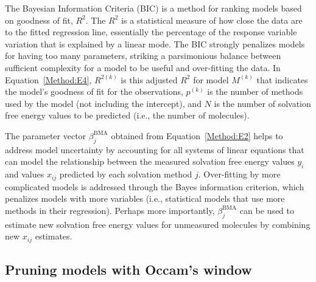 \documentclass[journal=jpcbfk, manuscript=article]{achemso}
\newcommand{\+}[1]{\ensuremath{\mathbf{#1}}}
\newcommand{\rev}[1]{#1}
\begin{document}
\rev{The Bayesian Information Criteria (BIC) is a method for ranking models based on goodness of fit, $R^2$.
The $R^2$ is a statistical measure of how close the data are to the fitted regression line, essentially the percentage of the response variable variation that is explained by a linear mode.
The BIC strongly penalizes models for having too many parameters, striking a parsimonious balance between sufficient complexity for a model to be useful and over-fitting the data. 
In Equation~\ref{Method:E4},  $R^{2(k)}$ is this adjusted $R^2$ for model $M^{(k)}$ that indicates the model's goodness of fit for the observations, $p^{(k)}$ is the number of methods used by the model (not including the intercept), and $N$ is the number of solvation free energy values to be predicted (i.e., the number of molecules).}

The parameter vector $\beta_j^{\text{BMA}}$ obtained from Equation~\ref{Method:E2} helps to address model uncertainty by accounting for all systems of linear equations that can model the relationship between the measured solvation free energy values $y_i$ and values $x_{ij}$ predicted by each solvation method $j$.
Over-fitting by more complicated models is addressed through the Bayes information criterion, which penalizes models with more variables \rev{(i.e., statistical models that use more methods in their regression)}.
Perhaps more importantly, $\beta_j^{\text{BMA}}$ can be used to estimate new solvation free energy values for unmeasured molecules by combining new $x_{i j}$ estimates.

\subsection{\rev{Pruning models with Occam's window}} \label{Method:StatEnsemble}
\end{document}
